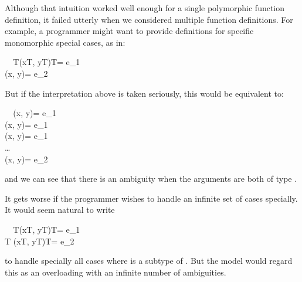 Although that intuition worked well enough 
for a single polymorphic function definition,
it failed utterly when we considered multiple function definitions.
For example, 
a programmer might want to provide definitions 
for specific monomorphic special cases, as in:
\small
\begin{FortressCode}
{\tt ~~}\+\llbracket{}T\rrbracket\bigl(x\COLON {}\llbracket{}T\rrbracket, y\COLON {}\llbracket{}T\rrbracket\bigr)\COLON {}\llbracket{}T\rrbracket = e_1 \\
  \bigl(x\COLON {}\llbracket{}\rrbracket, y\COLON {}\llbracket{}\rrbracket\bigr)\COLON {}\llbracket{}\rrbracket = e_2\-
\end{FortressCode}
\normalsize
But if the interpretation above is taken seriously, 
this would be equivalent to:
\small
\begin{FortressCode}
{\tt ~~}\+\bigl(x\COLON {}\llbracket{}\rrbracket, y\COLON {}\llbracket{}\rrbracket\bigr)\COLON {}\llbracket{}\rrbracket = e_1 \\
  \bigl(x\COLON {}\llbracket{}\rrbracket, y\COLON {}\llbracket{}\rrbracket\bigr)\COLON {}\llbracket{}\rrbracket = e_1 \\
  \bigl(x\COLON {}\llbracket{}\rrbracket, y\COLON {}\llbracket{}\rrbracket\bigr)\COLON {}\llbracket{}\rrbracket = e_1 \\
  \ldots \\
  \bigl(x\COLON {}\llbracket{}\rrbracket, y\COLON {}\llbracket{}\rrbracket\bigr)\COLON {}\llbracket{}\rrbracket = e_2\-
\end{FortressCode}
\normalsize
and we can see that there is an ambiguity 
when the arguments are both of type .

It gets worse if the programmer wishes to handle an infinite set of cases specially.  
It would seem natural to write
\small
\begin{FortressCode}
{\tt ~~}\+\llbracket{}T\rrbracket\bigl(x\COLON {}\llbracket{}T\rrbracket, y\COLON {}\llbracket{}T\rrbracket\bigr)\COLON {}\llbracket{}T\rrbracket = e_1 \\
  \llbracket{}T \SHORTCUT{<} \rrbracket\bigl(x\COLON {}\llbracket{}T\rrbracket, y\COLON {}\llbracket{}T\rrbracket\bigr)\COLON {}\llbracket{}T\rrbracket = e_2\-
\end{FortressCode}
\normalsize
to handle specially all cases where  is a subtype of .
But the model would regard this as an overloading 
with an infinite number of ambiguities.


